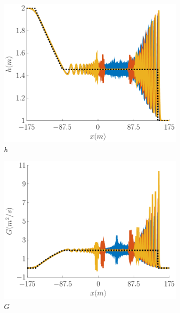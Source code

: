 \documentclass[10pt]{article}
\begin{document}
\begin{figure}
	\centering
	\begin{subfigure}{0.322\textwidth}
		\centering
		\includegraphics[width=\textwidth]{./Figures/Simulations/Study/ImpDisp/h.pdf}
		\caption{$h$}
	\end{subfigure}
	\begin{subfigure}{0.32\textwidth}
		\centering
		\includegraphics[width=\textwidth]{./Figures/Simulations/Study/ImpDisp/G.pdf}
		\caption{$G$}
	\end{subfigure}
	\begin{subfigure}{0.32\textwidth}

\end{subfigure}
\end{figure}
\end{document}
